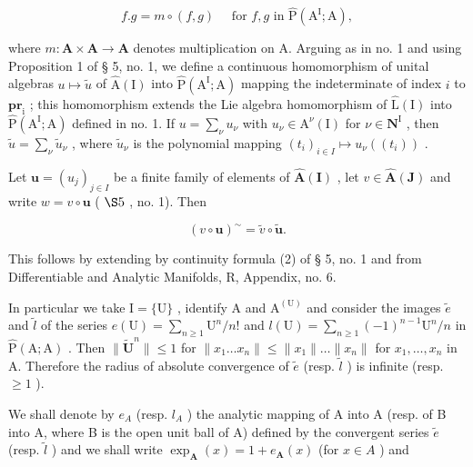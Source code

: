 \[
f. g = m \circ (f, g) \quad \text { for } f, g \text { in } \hat {\mathrm{P}} (\mathrm{A} ^ {\mathrm{I}}; \mathrm{A}),
\]

where \(m: \mathbf{A} \times \mathbf{A} \to \mathbf{A}\) denotes multiplication on A. Arguing as in no. 1 and using Proposition 1 of § 5, no. 1, we define a continuous homomorphism of unital algebras \(u \mapsto \tilde{u}\) of \(\hat{\mathrm{A}}(\mathrm{I})\) into \(\hat{\mathrm{P}}(\mathrm{A}^{\mathrm{I}}; \mathrm{A})\) mapping the indeterminate of index \(i\) to \(\mathbf{pr}_{\mathrm{i}}\) ; this homomorphism extends the Lie algebra homomorphism of \(\hat{\mathrm{L}}(\mathrm{I})\) into \(\hat{\mathrm{P}}(\mathrm{A}^{\mathrm{I}}; \mathrm{A})\) defined in no. 1. If \(u = \sum_{\nu} u_{\nu}\) with \(u_{\nu} \in \mathrm{A}^{\nu}(\mathrm{I})\) for \(\nu \in \mathbf{N}^{\mathrm{I}}\) , then \(\tilde{u} = \sum_{\nu} \tilde{u}_{\nu}\) , where \(\tilde{u}_{\nu}\) is the polynomial mapping \((t_{i})_{i \in I} \mapsto u_{\nu}((t_{i}))\) .

Let \(\boldsymbol{u} = (u_{j})_{j \in I}\) be a finite family of elements of \(\hat{\mathbf{A}}(\mathbf{I})\) , let \(v \in \hat{\mathbf{A}}(\mathbf{J})\) and write \(w = v \circ \boldsymbol{u}\) ( \(\S 5\) , no. 1). Then

\[
(v \circ \boldsymbol {u}) ^ {\sim} = \tilde {v} \circ \tilde {\boldsymbol {u}}.\tag{18}
\]

This follows by extending by continuity formula (2) of § 5, no. 1 and from Differentiable and Analytic Manifolds, R, Appendix, no. 6.

In particular we take \(\mathrm{I} = \{\mathrm{U}\}\) , identify A and \(\mathrm{A}^{(\mathrm{U})}\) and consider the images \(\tilde{e}\) and \(\tilde{l}\) of the series \(e(\mathrm{U}) = \sum_{n\geqslant 1}\mathrm{U}^n /n!\) and \(l(\mathrm{U}) = \sum_{n\geqslant 1}(-1)^{n - 1}\mathrm{U}^n /n\) in \(\hat{\mathrm{P}} (\mathrm{A};\mathrm{A})\) . Then \(\| \tilde{\mathbf{U}}^n\| \leqslant 1\) for \(\| x_1\dots x_n\| \leqslant \| x_1\| \dots \| x_n\|\) for \(x_{1},\ldots ,x_{n}\) in A. Therefore the radius of absolute convergence of \(\tilde{e}\) (resp. \(\tilde{l}\) ) is infinite (resp. \(\geqslant 1\) ).

We shall denote by \(e_{A}\) (resp. \(l_{A}\) ) the analytic mapping of A into A (resp. of B into A, where B is the open unit ball of A) defined by the convergent series \(\tilde{e}\) (resp. \(\tilde{l}\) ) and we shall write \(\exp_{\mathbf{A}}(x)=1+e_{\mathbf{A}}(x)\) (for \(x\in A\) ) and

